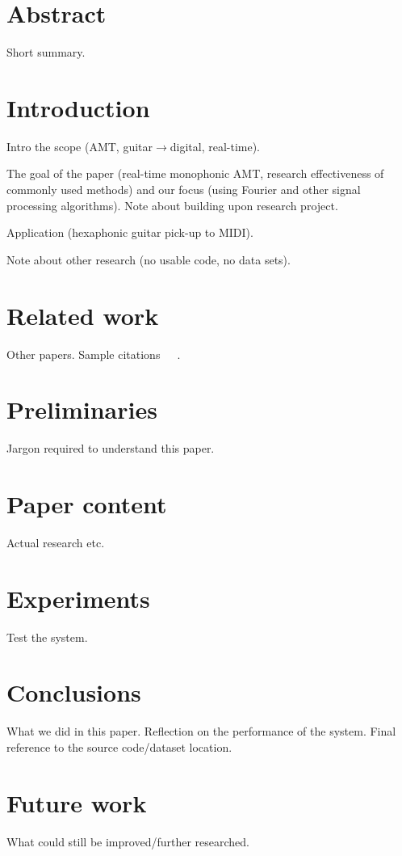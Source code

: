 \documentclass[10pt,twocolumn]{article}
\title{}
\author{Luc de Jonckheere}
\begin{document}

\maketitle


\section*{Abstract}
Short summary.


\section{Introduction}
Intro the scope (AMT, guitar$\rightarrow$digital, real-time).

The goal of the paper (real-time monophonic AMT, research effectiveness of commonly used methods) and our focus (using Fourier and other signal processing algorithms). Note about building upon research project.

Application (hexaphonic guitar pick-up to MIDI).

Note about other research (no usable code, no data sets).


\section{Related work}
Other papers. Sample citations~\cite{mono}~\cite{window}~\cite{twotimes}.


\section{Preliminaries}
Jargon required to understand this paper.


\section{Paper content}
Actual research etc.


\section{Experiments}  \label{sec:exp}
Test the system.


\section{Conclusions}
What we did in this paper. Reflection on the performance of the system. Final reference to the source code/dataset location.


\section{Future work}  \label{sec:future}
What could still be improved/further researched.





\end{document}

